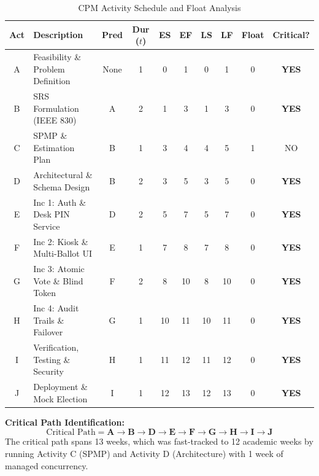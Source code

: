 \documentclass[12pt,a4paper,oneside]{report}
\begin{document}
\begin{table}[H]
    \centering
    \caption{CPM Activity Schedule and Float Analysis}
    \label{tab:cpm_table}
    \begin{tabularx}{\textwidth}{c X c c c c c c c c}
        \toprule
        \textbf{Act} & \textbf{Description} & \textbf{Pred} & \textbf{Dur ($t$)} & \textbf{ES} & \textbf{EF} & \textbf{LS} & \textbf{LF} & \textbf{Float} & \textbf{Critical?} \\
        \midrule
        A & Feasibility \& Problem Definition & None & 1 & 0 & 1 & 0 & 1 & 0 & \textbf{YES} \\
        B & SRS Formulation (IEEE 830) & A & 2 & 1 & 3 & 1 & 3 & 0 & \textbf{YES} \\
        C & SPMP \& Estimation Plan & B & 1 & 3 & 4 & 4 & 5 & 1 & NO \\
        D & Architectural \& Schema Design & B & 2 & 3 & 5 & 3 & 5 & 0 & \textbf{YES} \\
        E & Inc 1: Auth \& Desk PIN Service & D & 2 & 5 & 7 & 5 & 7 & 0 & \textbf{YES} \\
        F & Inc 2: Kiosk \& Multi-Ballot UI & E & 1 & 7 & 8 & 7 & 8 & 0 & \textbf{YES} \\
        G & Inc 3: Atomic Vote \& Blind Token & F & 2 & 8 & 10 & 8 & 10 & 0 & \textbf{YES} \\
        H & Inc 4: Audit Trails \& Failover & G & 1 & 10 & 11 & 10 & 11 & 0 & \textbf{YES} \\
        I & Verification, Testing \& Security & H & 1 & 11 & 12 & 11 & 12 & 0 & \textbf{YES} \\
        J & Deployment \& Mock Election & I & 1 & 12 & 13 & 12 & 13 & 0 & \textbf{YES} \\
        \bottomrule
    \end{tabularx}
\end{table}

\noindent \textbf{Critical Path Identification:}
\begin{equation}
    \text{Critical Path} = \mathbf{A \to B \to D \to E \to F \to G \to H \to I \to J}
\end{equation}
The critical path spans 13 weeks, which was fast-tracked to 12 academic weeks by running Activity C (SPMP) and Activity D (Architecture) with 1 week of managed concurrency.
\end{document}

